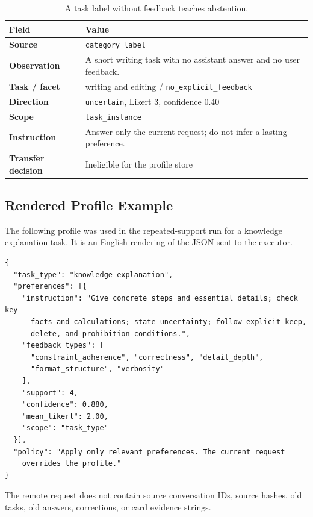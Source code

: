 \begin{table}[H]
\centering
\small
\caption{A task label without feedback teaches abstention.}
\label{tab:record-abstention}
\begin{tabularx}{\linewidth}{>{\bfseries}p{2.45cm}Y}
\toprule
{}
Field & Value \\
\midrule
Source & \texttt{category\_label} \\
Observation & A short writing task with no assistant answer and no user
feedback. \\
Task / facet & writing and editing / \texttt{no\_explicit\_feedback} \\
Direction & \texttt{uncertain}, Likert 3, confidence 0.40 \\
Scope & \texttt{task\_instance} \\
Instruction & Answer only the current request; do not infer a lasting
preference. \\
Transfer decision & Ineligible for the profile store \\
\bottomrule
\end{tabularx}
\end{table}

\subsection{Rendered Profile Example}

The following profile was used in the repeated-support run for a knowledge
explanation task. It is an English rendering of the JSON sent to the executor.

\begin{PromptBox}
\begin{lstlisting}[style=prompt]
{
  "task_type": "knowledge explanation",
  "preferences": [{
    "instruction": "Give concrete steps and essential details; check key
      facts and calculations; state uncertainty; follow explicit keep,
      delete, and prohibition conditions.",
    "feedback_types": [
      "constraint_adherence", "correctness", "detail_depth",
      "format_structure", "verbosity"
    ],
    "support": 4,
    "confidence": 0.880,
    "mean_likert": 2.00,
    "scope": "task_type"
  }],
  "policy": "Apply only relevant preferences. The current request
    overrides the profile."
}
\end{lstlisting}
\end{PromptBox}

The remote request does not contain source conversation IDs, source hashes,
old tasks, old answers, corrections, or card evidence strings.

